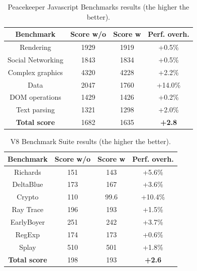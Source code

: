 \begin{table}[htdp] 
\begin{center}
\begin{tabular}{|c|c|c|c|} 
\hline
\bf{Benchmark} & \bf{Score w/o} & \bf{Score w} & \bf{Perf. overh.} \\
\hline
Rendering     	       &    1929 	& 	1919   	& 	+0.5\%\\
Social Networking 	&  	1843  	&     1834  	& 	+0.5\%\\
Complex graphics  	&  	4320 	&     4228  	& 	+2.2\%\\ 
Data                           &	2047	&     1760 	& 	+14.0\%\\
DOM operations 	       &    1429 	&	1426	& 	+0.2\%\\
Text parsing     	       &  	1321      &     1298 	& 	+2.0\%\\ 
\hline
\bf{Total score}        	&  1682 	   &      1635     & \bf{+2.8}\\ 
\hline
\end{tabular}
\end{center}
\caption{{ Peacekeeper Javascript Benchmarks results (the higher the better).}}
\vspace{0.3cm}
\label{peacekeeper}
\end{table} 

\begin{table}[htdp]   
\begin{center}
\begin{tabular}{|c|c|c|c|} 
\hline
\bf{Benchmark} & \bf{Score w/o} & \bf{Score w} & \bf{Perf. overh.} \\
\hline
Richards      &      151       &    143 	  & 	+5.6\%\\
DeltaBlue 	&      173  	&  	167  	& 	+3.6\%\\
Crypto  		&      110  	&  	99.6 	& 	+10.4\%\\ 
Ray Trace    &      196      &	193		& 	+1.5\%\\
EarlyBoyer	&      251 	&	242		& 	+3.7\%\\
RegExp     	&      174 	&  	173		& 	+0.6\%\\ 
Splay     	&      510 	&  	501		& 	+1.8\%\\ 
\hline
\bf{Total score}        &      198     &  193   & \bf{+2.6}\\ 
\hline
\end{tabular}
\end{center}
\caption{{ V8 Benchmark Suite results (the higher the better).}}
\vspace{0.3cm}
\label{v8}
\end{table} 

